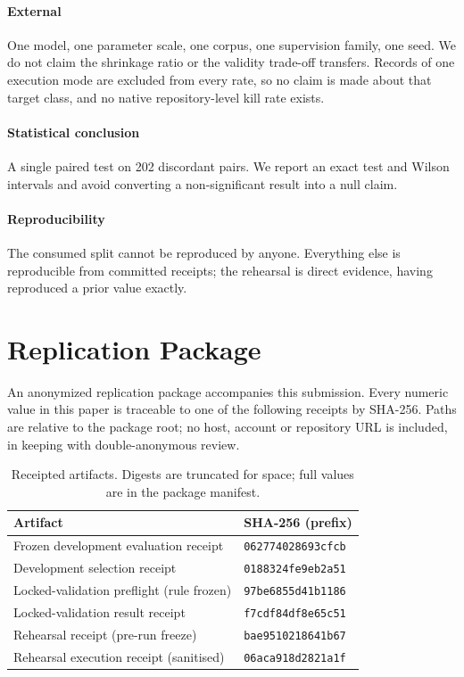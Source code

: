 \documentclass[10pt,conference,letterpaper]{IEEEtran}
\begin{document}
\paragraph{External}
One model, one parameter scale, one corpus, one supervision family, one seed. We
do not claim the shrinkage ratio or the validity trade-off transfers. Records of
one execution mode are excluded from every rate, so no claim is made about that
target class, and no native repository-level kill rate exists.

\paragraph{Statistical conclusion}
A single paired test on 202 discordant pairs. We report an exact test and Wilson
intervals \cite{wilson1927probable,arcuri2014hitchhiker} and avoid converting a
non-significant result into a null claim.

\paragraph{Reproducibility}
The consumed split cannot be reproduced by anyone. Everything else is
reproducible from committed receipts; the rehearsal is direct evidence, having
reproduced a prior value exactly.

\section{Replication Package}
\label{sec:replication}

An anonymized replication package accompanies this submission. Every numeric
value in this paper is traceable to one of the following receipts by SHA-256.
Paths are relative to the package root; no host, account or repository URL is
included, in keeping with double-anonymous review.

\begin{table}[h]
\caption{Receipted artifacts. Digests are truncated for space; full values are
in the package manifest.}
\label{tab:artifacts}
\centering
\scriptsize
\begin{tabular}{@{}ll@{}}
\toprule
Artifact & SHA-256 (prefix) \\
\midrule
Frozen development evaluation receipt & \texttt{062774028693cfcb} \\
Development selection receipt & \texttt{0188324fe9eb2a51} \\
Locked-validation preflight (rule frozen) & \texttt{97be6855d41b1186} \\
Locked-validation result receipt & \texttt{f7cdf84df8e65c51} \\
Rehearsal receipt (pre-run freeze) & \texttt{bae9510218641b67} \\
Rehearsal execution receipt (sanitised) & \texttt{06aca918d2821a1f} \\
\bottomrule
\end{tabular}
\end{table}
\end{document}
